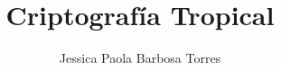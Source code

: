\documentclass[spanish,12pt,twoside]{book}
\theoremstyle{definition}
\begin{document}
%
\addtolength{\voffset}{-1in}
\frontmatter
\title{\textbf{Criptografía Tropical}}
\author{Jessica Paola Barbosa Torres}
\date{}
\maketitle
%
\addtolength{\voffset}{-1in}
\pagestyle{fancy}
%

\tableofcontents
\mainmatter
\fancyhead{}
\fancyfoot{}
\fancyhead[LE,RO]{\tiny{\slshape \rightmark}}
\fancyhead[LO,RE]{\slshape \leftmark}
\fancyfoot[RO,LE]{\thepage}

%
%
%
%
%
%
%
%
%
%
%
%
\end{document}
